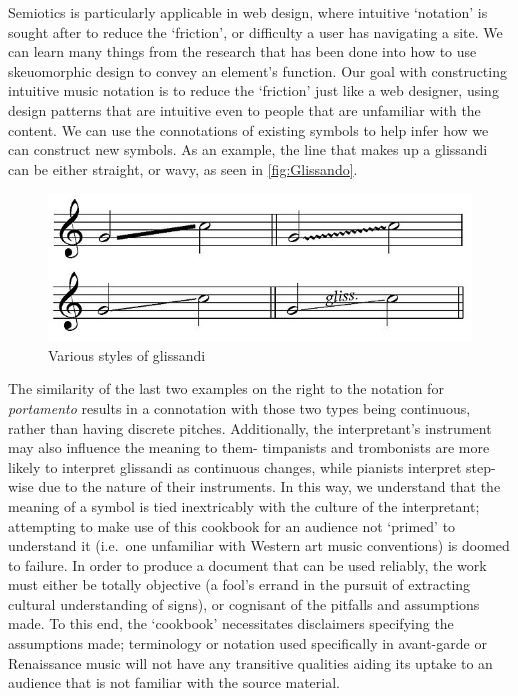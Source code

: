 Semiotics is particularly applicable in web design, where intuitive `notation' is sought after to reduce the `friction', or difficulty a user has navigating a site.
We can learn many things from the research that has been done into how to use skeuomorphic design to convey an element's function.
Our goal with constructing intuitive music notation is to reduce the `friction' just like a web designer, using design patterns that are intuitive even to people that are unfamiliar with the content.
We can use the connotations of existing symbols to help infer how we can construct new symbols.
As an example, the line that makes up a glissandi can be either straight, or wavy, as seen in \autoref{fig:Glissando}.
\begin{figure}
    \includegraphics[]{./resources/glissando.jpg}
\caption{Various styles of glissandi}\label{fig:Glissando}
\end{figure}
The similarity of the last two examples on the right to the notation for \emph{portamento} results in a connotation with those two types being continuous, rather than having discrete pitches.
Additionally, the interpretant's instrument may also influence the meaning to them- timpanists and trombonists are more likely to interpret glissandi as continuous changes, while pianists interpret step-wise due to the nature of their instruments.
In this way, we understand that the meaning of a symbol is tied inextricably with the culture of the interpretant; attempting to make use of this cookbook for an audience not `primed' to understand it (i.e.\ one unfamiliar with Western art music conventions) is doomed to failure.
In order to produce a document that can be used reliably, the work must either be totally objective (a fool's errand in the pursuit of extracting cultural understanding of signs), or cognisant of the pitfalls and assumptions made.
To this end, the `cookbook' necessitates disclaimers specifying the assumptions made; terminology or notation used specifically in avant-garde or Renaissance music will not have any transitive qualities aiding its uptake to an audience that is not familiar with the source material.

